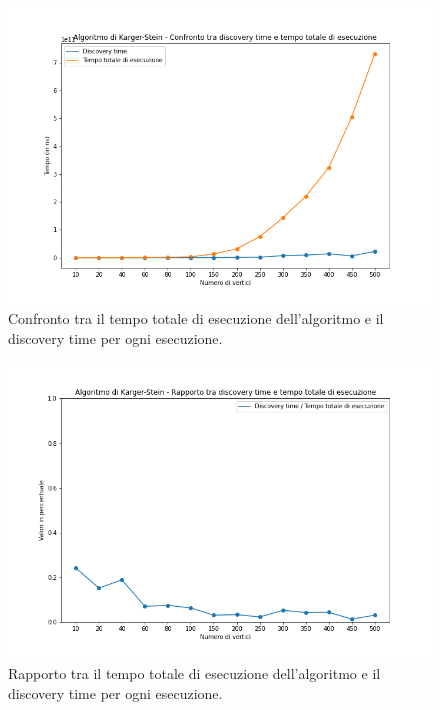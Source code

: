 \begin{figure}[H]
	\centering
	\includegraphics[width=1\textwidth]{res/images/single/karger-stein/discovery-time/karger_stein_confronto_discovery_time_total_time.png}
	\caption{Confronto tra il tempo totale di esecuzione dell'algoritmo e il discovery time per ogni esecuzione.}
	\label{fig:karger_stein_confronto_discovery_time_total_time}
\end{figure}

\begin{figure}[H]
	\centering
	\includegraphics[width=1\textwidth]{res/images/single/karger-stein/discovery-time/karger_stein_rapporto_discovery_time_total_time.png}
	\caption{Rapporto tra il tempo totale di esecuzione dell'algoritmo 
	e il discovery time per ogni esecuzione.}
	\label{fig:karger_stein_rapporto_discovery_time_total_time}
\end{figure}

